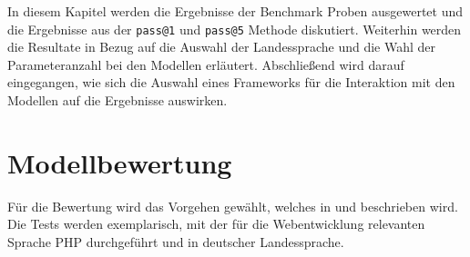 In diesem Kapitel werden die Ergebnisse der Benchmark Proben ausgewertet und die Ergebnisse aus der \texttt{pass@1} und \texttt{pass@5} Methode diskutiert. Weiterhin werden die Resultate in Bezug auf die Auswahl der Landessprache und die Wahl der Parameteranzahl bei den Modellen erläutert. Abschließend wird darauf eingegangen, wie sich die Auswahl eines Frameworks für die Interaktion mit den Modellen auf die Ergebnisse auswirken.\vspace{0.2cm}



\section{Modellbewertung}
Für die Bewertung wird das Vorgehen gewählt, welches in \cite{chen-2021} und \cite{peng-2024} beschrieben wird. Die Tests werden exemplarisch, mit der für die Webentwicklung relevanten Sprache PHP durchgeführt und in deutscher Landessprache.\vspace{0.2cm}

